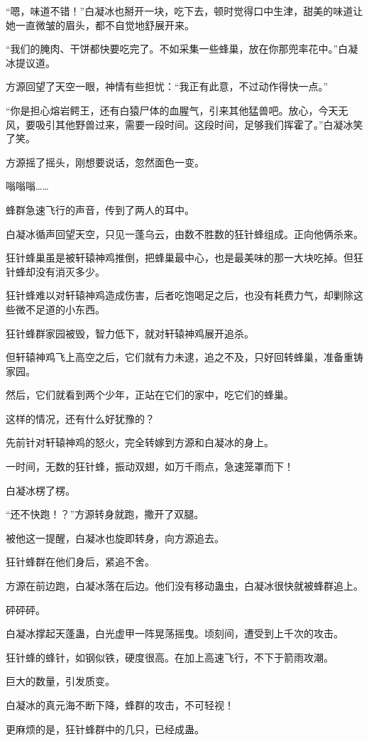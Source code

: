 \begin{this_body}
“嗯，味道不错！”白凝冰也掰开一块，吃下去，顿时觉得口中生津，甜美的味道让她一直微皱的眉头，都不自觉地舒展开来。

“我们的腌肉、干饼都快要吃完了。不如采集一些蜂巢，放在你那兜率花中。”白凝冰提议道。

方源回望了天空一眼，神情有些担忧：“我正有此意，不过动作得快一点。”

“你是担心熔岩鳄王，还有白猿尸体的血腥气，引来其他猛兽吧。放心，今天无风，要吸引其他野兽过来，需要一段时间。这段时间，足够我们挥霍了。”白凝冰笑了笑。

方源摇了摇头，刚想要说话，忽然面色一变。

嗡嗡嗡……

蜂群急速飞行的声音，传到了两人的耳中。

白凝冰循声回望天空，只见一蓬乌云，由数不胜数的狂针蜂组成。正向他俩杀来。

狂针蜂巢虽是被轩辕神鸡推倒，把蜂巢最中心，也是最美味的那一大块吃掉。但狂针蜂却没有消灭多少。

狂针蜂难以对轩辕神鸡造成伤害，后者吃饱喝足之后，也没有耗费力气，却剿除这些微不足道的小东西。

狂针蜂群家园被毁，智力低下，就对轩辕神鸡展开追杀。

但轩辕神鸡飞上高空之后，它们就有力未逮，追之不及，只好回转蜂巢，准备重铸家园。

然后，它们就看到两个少年，正站在它们的家中，吃它们的蜂巢。

这样的情况，还有什么好犹豫的？

先前针对轩辕神鸡的怒火，完全转嫁到方源和白凝冰的身上。

一时间，无数的狂针蜂，振动双翅，如万千雨点，急速笼罩而下！

白凝冰楞了楞。

“还不快跑！？”方源转身就跑，撒开了双腿。

被他这一提醒，白凝冰也旋即转身，向方源追去。

狂针蜂群在他们身后，紧追不舍。

方源在前边跑，白凝冰落在后边。他们没有移动蛊虫，白凝冰很快就被蜂群追上。

砰砰砰。

白凝冰撑起天蓬蛊，白光虚甲一阵晃荡摇曳。顷刻间，遭受到上千次的攻击。

狂针蜂的蜂针，如钢似铁，硬度很高。在加上高速飞行，不下于箭雨攻潮。

巨大的数量，引发质变。

白凝冰的真元海不断下降，蜂群的攻击，不可轻视！

更麻烦的是，狂针蜂群中的几只，已经成蛊。


\end{this_body}
